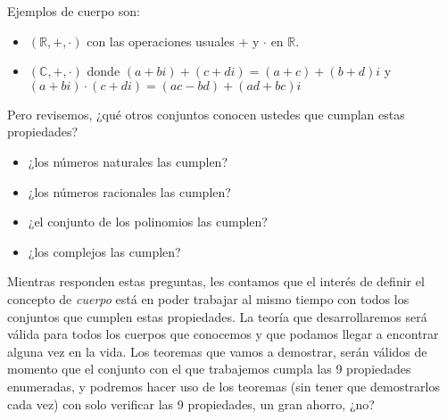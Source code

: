 \documentclass[12pt]{book}
\def\R{\mathbb{R}}
\def\C{\mathbb{C}}
\begin{document}
Ejemplos de cuerpo son:
\begin{itemize}
\item $(\R,+,\cdot)$ con las operaciones usuales $+$ y $\cdot$ en $\R$.\
\item $(\C,+,\cdot)$ donde $(a+bi)+(c+di)=(a+c)+(b+d)i$ y  $(a+bi)\cdot(c+di)=(ac-bd)+(ad+bc)i$
\end{itemize}

Pero revisemos, ¿qué otros conjuntos conocen ustedes que cumplan estas propiedades? 
\begin{itemize}
\item ¿los números naturales las cumplen?
\item ¿los números racionales las cumplen?
\item ¿el conjunto de los polinomios las cumplen? 
\item ¿los complejos las cumplen?
\end{itemize}

Mientras responden estas preguntas, les contamos que el interés de definir el concepto de \emph{cuerpo} está en poder trabajar al mismo tiempo con todos los conjuntos que cumplen estas propiedades. La teoría que desarrollaremos será válida para todos los cuerpos que conocemos y que podamos llegar a encontrar alguna vez en la vida. Los teoremas que vamos a demostrar, serán válidos de momento que el conjunto con el que trabajemos cumpla las 9 propiedades enumeradas, y podremos hacer uso de los teoremas (sin tener que demostrarlos cada vez) con solo verificar las 9 propiedades, un gran ahorro, ¿no?
\end{document}
